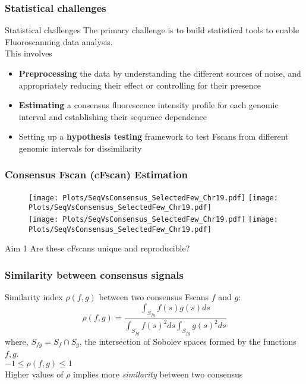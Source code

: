 \documentclass[10pt,dvipsnames,table]{beamer}
\begin{document}
\begin{frame}
\frametitle{Statistical challenges}
\begin{block}{Statistical challenges}
{\Large{The primary challenge is to build statistical tools to enable Fluoroscanning data analysis.}} \\This involves
\begin{itemize}
\item {\bf{Preprocessing}} the data by understanding the different sources of noise, and appropriately reducing their effect or controlling for their presence
\vspace{0.5cm}
\item {\bf{Estimating}} a consensus fluorescence intensity profile for each genomic interval and establishing their sequence dependence
\vspace{0.5cm}
\item Setting up a {\bf{hypothesis testing}} framework to test Fscans from different genomic intervals for dissimilarity
\end{itemize}
\end{block}
\end{frame}

\begin{frame}
\frametitle{Consensus Fscan (cFscan) Estimation}
\vspace{-0.5cm}
\begin{figure}
\texttt{[image: Plots/SeqVsConsensus\_SelectedFew\_Chr19.pdf]}
\pause
\hspace{0.5cm}
\texttt{[image: Plots/SeqVsConsensus\_SelectedFew\_Chr19.pdf]} \\
\texttt{[image: Plots/SeqVsConsensus\_SelectedFew\_Chr19.pdf]}
\hspace{0.5cm}
\texttt{[image: Plots/SeqVsConsensus\_SelectedFew\_Chr19.pdf]}
\end{figure}
\end{frame}

\begin{frame}
\begin{block}{Aim 1}
Are these cFscans unique and reproducible?
\end{block}
\end{frame}

\begin{frame}
\frametitle{Similarity between consensus signals}
Similarity index $\rho(f, g)$ between two consensus Fscans $f$ and $g$:
\[ \rho(f, g) = \frac{\int _{S_{fg}}f(s)g(s) ds}{\int _{S_{fg}}f(s)^2 ds \int _{S_{fg}}g(s)^2 ds} \]
where, $S_{fg} = S_f \cap S_g$, the intersection of Sobolev spaces formed by the functions $f, g$.\\
$-1 \leq \rho(f, g) \leq 1$ \\
Higher values of $\rho$ implies more {\emph{similarity}} between two consensus

\end{frame}
\end{document}
